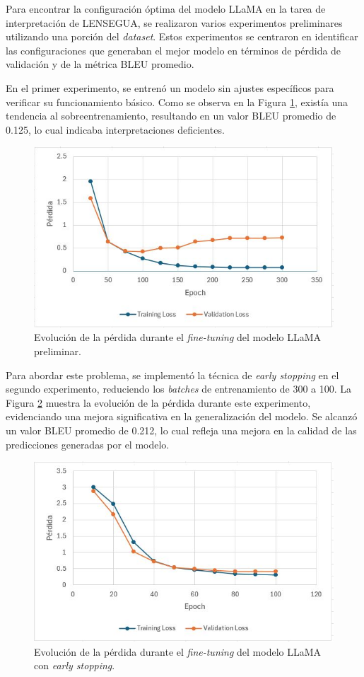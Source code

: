 Para encontrar la configuración óptima del modelo LLaMA en la tarea de interpretación de LENSEGUA, se realizaron varios experimentos preliminares utilizando una porción del \textit{dataset}. Estos experimentos se centraron en identificar las configuraciones que generaban el mejor modelo en términos de pérdida de validación y de la métrica BLEU promedio.

En el primer experimento, se entrenó un modelo sin ajustes específicos para verificar su funcionamiento básico. Como se observa en la Figura \ref{fig:LLAMAm1}, existía una tendencia al sobreentrenamiento, resultando en un valor BLEU promedio de 0.125, lo cual indicaba interpretaciones deficientes.

\vspace{0.5cm}
\begin{figure}[H]
\centering
	\includegraphics[height=5.5 cm]{figuras/Resultado1.JPG}
    \caption{Evolución de la pérdida durante el \textit{fine-tuning} del modelo LLaMA preliminar.}
    \label{fig:LLAMAm1}
\end{figure}


Para abordar este problema, se implementó la técnica de \textit{early stopping} en el segundo experimento, reduciendo los \textit{batches} de entrenamiento de 300 a 100. La Figura \ref{fig:LLAMAm2} muestra la evolución de la pérdida durante este experimento, evidenciando una mejora significativa en la generalización del modelo. Se alcanzó un valor BLEU promedio de 0.212, lo cual refleja una mejora en la calidad de las predicciones generadas por el modelo. 

\vspace{0.5cm}
\begin{figure}[H]
\centering
	\includegraphics[height=5.5 cm]{figuras/Resultado2.JPG}
    \caption{Evolución de la pérdida durante el \textit{fine-tuning} del modelo LLaMA con \textit{early stopping}.}
    \label{fig:LLAMAm2}
\end{figure}

